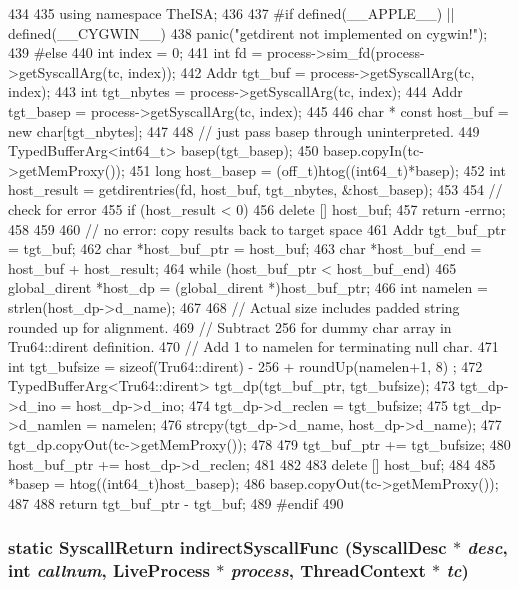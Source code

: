 \begin{DoxyCode}
434     {
435         using namespace TheISA;
436 
437 #if defined(__APPLE__) || defined(__CYGWIN__)
438         panic("getdirent not implemented on cygwin!");
439 #else
440         int index = 0;
441         int fd = process->sim_fd(process->getSyscallArg(tc, index));
442         Addr tgt_buf = process->getSyscallArg(tc, index);
443         int tgt_nbytes = process->getSyscallArg(tc, index);
444         Addr tgt_basep = process->getSyscallArg(tc, index);
445 
446         char * const host_buf = new char[tgt_nbytes];
447 
448         // just pass basep through uninterpreted.
449         TypedBufferArg<int64_t> basep(tgt_basep);
450         basep.copyIn(tc->getMemProxy());
451         long host_basep = (off_t)htog((int64_t)*basep);
452         int host_result = getdirentries(fd, host_buf, tgt_nbytes, &host_basep);
453 
454         // check for error
455         if (host_result < 0) {
456             delete [] host_buf;
457             return -errno;
458         }
459 
460         // no error: copy results back to target space
461         Addr tgt_buf_ptr = tgt_buf;
462         char *host_buf_ptr = host_buf;
463         char *host_buf_end = host_buf + host_result;
464         while (host_buf_ptr < host_buf_end) {
465             global_dirent *host_dp = (global_dirent *)host_buf_ptr;
466             int namelen = strlen(host_dp->d_name);
467 
468             // Actual size includes padded string rounded up for alignment.
469             // Subtract 256 for dummy char array in Tru64::dirent definition.
470             // Add 1 to namelen for terminating null char.
471             int tgt_bufsize = sizeof(Tru64::dirent) - 256 + roundUp(namelen+1, 8)
      ;
472             TypedBufferArg<Tru64::dirent> tgt_dp(tgt_buf_ptr, tgt_bufsize);
473             tgt_dp->d_ino = host_dp->d_ino;
474             tgt_dp->d_reclen = tgt_bufsize;
475             tgt_dp->d_namlen = namelen;
476             strcpy(tgt_dp->d_name, host_dp->d_name);
477             tgt_dp.copyOut(tc->getMemProxy());
478 
479             tgt_buf_ptr += tgt_bufsize;
480             host_buf_ptr += host_dp->d_reclen;
481         }
482 
483         delete [] host_buf;
484 
485         *basep = htog((int64_t)host_basep);
486         basep.copyOut(tc->getMemProxy());
487 
488         return tgt_buf_ptr - tgt_buf;
489 #endif
490     }
\end{DoxyCode}
\hypertarget{classTru64_a82607daf4ef0639e0013656b0c861927}{
\subsubsection[{indirectSyscallFunc}]{\setlength{\rightskip}{0pt plus 5cm}static {\bf SyscallReturn} indirectSyscallFunc ({\bf SyscallDesc} $\ast$ {\em desc}, \/  int {\em callnum}, \/  {\bf LiveProcess} $\ast$ {\em process}, \/  {\bf ThreadContext} $\ast$ {\em tc})}}
\label{classTru64_a82607daf4ef0639e0013656b0c861927}


